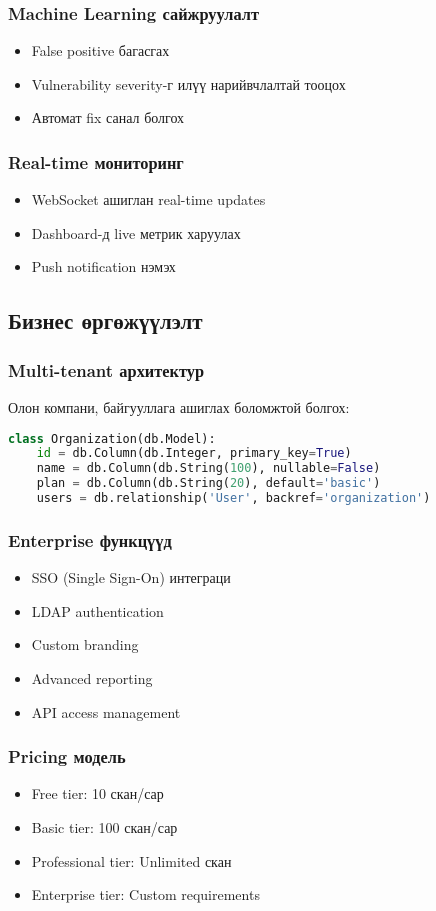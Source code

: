 \documentclass[main.tex]{subfiles}
\begin{document}
\subsubsection{Machine Learning сайжруулалт}
\begin{itemize}
    \item False positive багасгах
    \item Vulnerability severity-г илүү нарийвчлалтай тооцох
    \item Автомат fix санал болгох
\end{itemize}

\subsubsection{Real-time мониторинг}
\begin{itemize}
    \item WebSocket ашиглан real-time updates
    \item Dashboard-д live метрик харуулах
    \item Push notification нэмэх
\end{itemize}

\subsection{Бизнес өргөжүүлэлт}

\subsubsection{Multi-tenant архитектур}
Олон компани, байгууллага ашиглах боломжтой болгох:

\begin{lstlisting}[language=Python, caption=Organization модель]
class Organization(db.Model):
    id = db.Column(db.Integer, primary_key=True)
    name = db.Column(db.String(100), nullable=False)
    plan = db.Column(db.String(20), default='basic')
    users = db.relationship('User', backref='organization')
\end{lstlisting}

\subsubsection{Enterprise функцүүд}
\begin{itemize}
    \item SSO (Single Sign-On) интеграци
    \item LDAP authentication
    \item Custom branding
    \item Advanced reporting
    \item API access management
\end{itemize}

\subsubsection{Pricing модель}
\begin{itemize}
    \item Free tier: 10 скан/сар
    \item Basic tier: 100 скан/сар
    \item Professional tier: Unlimited скан
    \item Enterprise tier: Custom requirements
\end{itemize}
\end{document}
